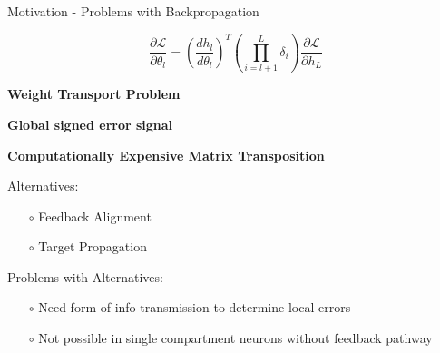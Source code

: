 \documentclass[dvipsnames, usenames]{beamer}
\newcommand{\xmark}{\ding{55}}%
\newcommand{\wontfix}{\rlap{$\square$}{\large\hspace{1pt}\xmark}}
\begin{document}
\begin{frame}{Motivation - Problems with Backpropagation}
\vspace{-0.5cm}

\begin{equation*}
	\frac{\partial \mathcal{L}}{\partial \theta_l} 
	=  \left(\frac{dh_{l}}{d \theta_{l}}\right)^T \left(\prod_{i=l+1}^L \delta_i\right) \frac{\partial \mathcal{L}}{\partial h_{L}}
\end{equation*}

\begin{todolist}
\item[\wontfix] \textbf{Weight Transport Problem} \pause
\item[\wontfix] \textbf{Global signed error signal} \pause
\item[\wontfix] \textbf{Computationally Expensive Matrix Transposition} \pause
\item Alternatives:
\begin{itemize}
	\item[$\circ$] Feedback Alignment \citep{lillicrap2016}
	\item[$\circ$] Target Propagation \citep{lee2015}
\end{itemize}
\pause
\item Problems with Alternatives:
\begin{itemize}
	\item[$\circ$] Need form of info transmission to determine local errors 
	\item[$\circ$] Not possible in single compartment neurons without feedback pathway
\end{itemize}
\end{todolist}
\end{frame}
\end{document}
